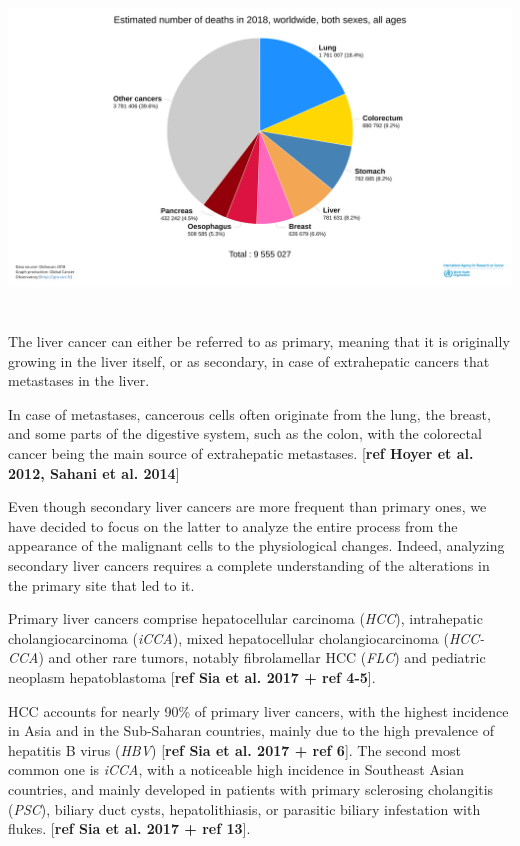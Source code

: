 \documentclass[]{article}
\begin{document}
\includegraphics[width=6.26046in,height=3.46354in]{./images/media/image14.png}

The liver cancer can either be referred to as primary, meaning that it
is originally growing in the liver itself, or as secondary, in case of
extrahepatic cancers that metastases in the liver.

In case of metastases, cancerous cells often originate from the lung,
the breast, and some parts of the digestive system, such as the colon,
with the colorectal cancer being the main source of extrahepatic
metastases. {[}\textbf{ref Hoyer et al. 2012, Sahani et al. 2014}{]}

Even though secondary liver cancers are more frequent than primary ones,
we have decided to focus on the latter to analyze the entire process
from the appearance of the malignant cells to the physiological changes.
Indeed, analyzing secondary liver cancers requires a complete
understanding of the alterations in the primary site that led to it.

Primary liver cancers comprise hepatocellular carcinoma (\emph{HCC}),
intrahepatic cholangiocarcinoma (\emph{iCCA}), mixed hepatocellular
cholangiocarcinoma (\emph{HCC-CCA}) and other rare tumors, notably
fibrolamellar HCC (\emph{FLC}) and pediatric neoplasm hepatoblastoma
{[}\textbf{ref Sia et al. 2017 + ref 4-5}{]}.

HCC accounts for nearly 90\% of primary liver cancers, with the highest
incidence in Asia and in the Sub-Saharan countries, mainly due to the
high prevalence of hepatitis B virus (\emph{HBV}) {[}\textbf{ref Sia et
al. 2017 + ref 6}{]}. The second most common one is \emph{iCCA}, with a
noticeable high incidence in Southeast Asian countries, and mainly
developed in patients with primary sclerosing cholangitis (\emph{PSC}),
biliary duct cysts, hepatolithiasis, or parasitic biliary infestation
with flukes. {[}\textbf{ref Sia et al. 2017 + ref 13}{]}.
\end{document}
